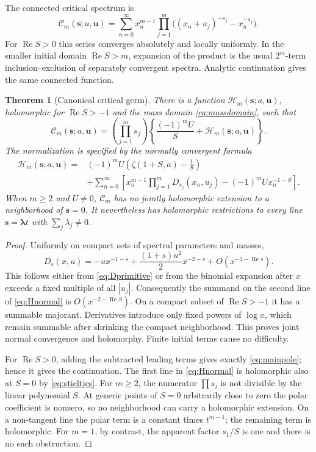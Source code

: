 \documentclass[11pt]{article}
\numberwithin{equation}{section}
\newtheorem{theorem}{Theorem}[section]
\theoremstyle{definition}\newtheorem{definition}[theorem]{Definition}
\theoremstyle{remark}\newtheorem{remark}[theorem]{Remark}
\newcommand{\Rea}{\operatorname{Re}}
\newcommand{\bs}{\boldsymbol{s}}
\newcommand{\bu}{\boldsymbol{u}}
\newcommand{\cH}{\mathcal H}
\newcommand{\cC}{\mathcal C}
\begin{document}
The connected critical spectrum is
\begin{equation}\label{eq:Cdef}
 \cC_m(\bs;a,\bu)=
 \sum_{n=0}^{\infty}x_n^{m-1}
 \prod_{j=1}^m\bigl((x_n+u_j)^{-s_j}-x_n^{-s_j}\bigr).
\end{equation}
For $\Rea S>0$ this series converges absolutely and locally uniformly. In the smaller initial domain $\Rea S>m$, expansion of the product is the usual $2^m$-term inclusion--exclusion of separately convergent spectra. Analytic continuation gives the same connected function.

\begin{theorem}[Canonical critical germ]\label{thm:germ}
There is a function $\cH_m(\bs;a,\bu)$, holomorphic for $\Rea S>-1$ and the mass domain \eqref{eq:massdomain}, such that
\begin{equation}\label{eq:mainpole}
 \cC_m(\bs;a,\bu)=
 \left(\prod_{j=1}^m s_j\right)
 \left\{\frac{(-1)^mU}{S}+\cH_m(\bs;a,\bu)\right\}.
\end{equation}
The normalization is specified by the normally convergent formula
\begin{align}\label{eq:Hnormal}
 \cH_m(\bs;a,\bu)
 ={}&(-1)^mU\left(\zeta(1+S,a)-\frac1S\right)\\
 &+\sum_{n=0}^{\infty}\left[
 x_n^{m-1}\prod_{j=1}^mD_{s_j}(x_n,u_j)
 -(-1)^mU x_n^{-1-S}\right].\nonumber
\end{align}
When $m\ge2$ and $U\ne0$, $\cC_m$ has no jointly holomorphic extension to a neighborhood of $\bs=0$. It nevertheless has holomorphic restrictions to every line $\bs=\bm\lambda t$ with $\sum_j\lambda_j\ne0$.
\end{theorem}
\begin{proof}
Uniformly on compact sets of spectral parameters and masses,
\[
 D_s(x,u)=-u x^{-1-s}+\frac{(1+s)u^2}{2}x^{-2-s}
             +O(x^{-3-\Rea s}).
\]
This follows either from \eqref{eq:Dprimitive} or from the binomial expansion after $x$ exceeds a fixed multiple of all $|u_j|$. Consequently the summand on the second line of \eqref{eq:Hnormal} is $O(x^{-2-\Rea S})$. On a compact subset of $\Rea S>-1$ it has a summable majorant. Derivatives introduce only fixed powers of $\log x$, which remain summable after shrinking the compact neighborhood. This proves joint normal convergence and holomorphy. Finite initial terms cause no difficulty.

For $\Rea S>0$, adding the subtracted leading terms gives exactly \eqref{eq:mainpole}; hence it gives the continuation. The first line in \eqref{eq:Hnormal} is holomorphic also at $S=0$ by \eqref{eq:stieltjes}. For $m\ge2$, the numerator $\prod s_j$ is not divisible by the linear polynomial $S$. At generic points of $S=0$ arbitrarily close to zero the polar coefficient is nonzero, so no neighborhood can carry a holomorphic extension. On a non-tangent line the polar term is a constant times $t^{m-1}$; the remaining term is holomorphic. For $m=1$, by contrast, the apparent factor $s_1/S$ is one and there is no such obstruction.
\end{proof}
\end{document}
